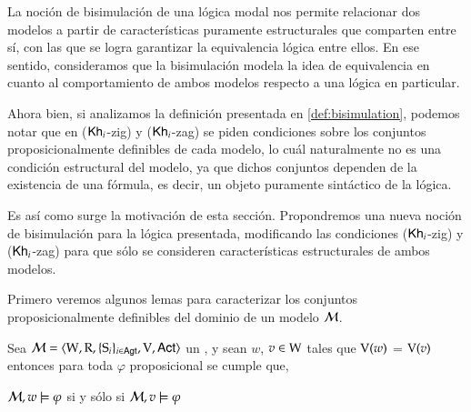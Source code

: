 La noción de bisimulación de una lógica modal nos permite relacionar dos modelos a partir de características puramente estructurales 
que comparten entre sí, con las que se logra garantizar la equivalencia lógica entre ellos. En ese sentido, consideramos que la 
bisimulación modela la idea de equivalencia en cuanto al comportamiento de ambos modelos respecto a una lógica en particular.

Ahora bien, si analizamos la definición presentada en \ref{def:bisimulation}, podemos notar que en ($\mathsf{Kh}_i$-zig) y ($\mathsf{Kh}_i$-zag) se piden condiciones 
sobre los conjuntos proposicionalmente definibles de cada modelo, lo cuál naturalmente no es una condición estructural del modelo, 
ya que dichos conjuntos dependen de la existencia de una fórmula, es decir, un objeto puramente sintáctico de la lógica. 

Es así como surge la motivación de esta sección. Propondremos una nueva noción de bisimulación para la lógica presentada, modificando las condiciones
($\mathsf{Kh}_i$-zig) y ($\mathsf{Kh}_i$-zag) para que sólo se consideren características estructurales de ambos modelos.

Primero veremos algunos lemas para caracterizar los conjuntos proposicionalmente definibles del dominio de un modelo $\mathcal{M}$.

\begin{lema}\label{ref:propositional-equivalence}
    Sea $\mathcal{M}=\langle \mathrm{W},\mathrm{R},\{ \mathrm{S}_i \}_{i \in {\rm \sf Agt}},\mathrm{V},{\rm \sf Act} \rangle$ un \ults, y sean $w$, $v \in \mathrm{W}$
    tales que $\mathrm{V}(w)$ = $\mathrm{V}(v)$ entonces para toda $\varphi$ proposicional se cumple que, 
    \begin{center}
    $\mathcal{M}, w \models \varphi$ \quad si y sólo si \quad $ 
    \mathcal{M}, v \models \varphi$
    \end{center}
\end{lema}

